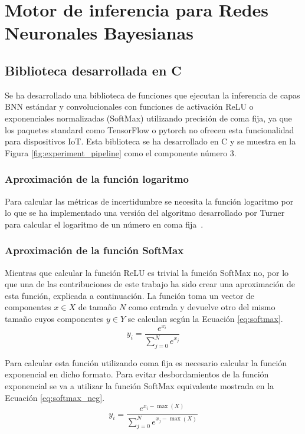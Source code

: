 \chapter{Motor de inferencia para Redes Neuronales Bayesianas} \label{ch:motor_inferencia}

\section{Biblioteca desarrollada en C}

Se ha desarrollado una biblioteca de funciones que ejecutan la inferencia de capas BNN estándar y convolucionales con funciones de activación ReLU o exponenciales normalizadas (SoftMax) utilizando precisión de coma fija, ya que los paquetes standard como TensorFlow o pytorch no ofrecen esta funcionalidad para dispositivos IoT. Esta biblioteca se ha desarrollado en C y se muestra en la Figura \ref{fig:experiment_pipeline} como el componente número 3.

\subsection{Aproximación de la función logaritmo}

Para calcular las métricas de incertidumbre se necesita la función logaritmo por lo que se ha implementado una versión del algoritmo desarrollado por Turner para calcular el logaritmo de un número en coma fija~\cite{binary_log}.

\subsection{Aproximación de la función SoftMax}

Mientras que calcular la función ReLU es trivial la función SoftMax no, por lo que una de las contribuciones de este trabajo ha sido crear una aproximación de esta función, explicada a continuación. La función toma un vector de componentes $x \in X$ de tamaño $N$ como entrada y devuelve otro del mismo tamaño cuyos componentes $y\in Y$ se calculan según la Ecuación \ref{eq:softmax}.
\begin{equation} \label{eq:softmax}
y_i = \dfrac{e^{x_i}}{\sum_{j = 0}^N e^{x_j}}
\end{equation}

Para calcular esta función utilizando coma fija es necesario calcular la función exponencial en dicho formato. Para evitar desbordamientos de la función exponencial se va a utilizar la función SoftMax equivalente mostrada en la Ecuación \ref{eq:softmax_neg}.
\begin{equation} \label{eq:softmax_neg}
y_i = \dfrac{e^{x_i - \max(X)}}{\sum_{j = 0}^N e^{x_j - \max(X)}}
\end{equation}

